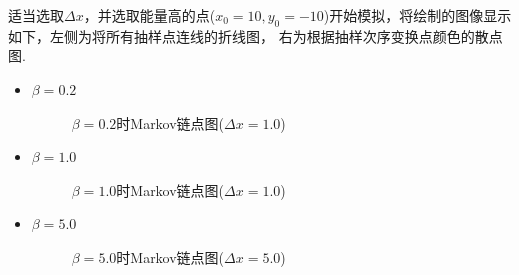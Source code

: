 \documentclass[12pt,a4paper,utf8]{ctexart}
\begin{document}
适当选取$\Delta x$，并选取能量高的点($x_0=10, y_0=-10$)开始模拟，将绘制的图像显示如下，左侧为将所有抽样点连线的折线图，
右为根据抽样次序变换点颜色的散点图.
\begin{itemize}
    \item $\beta=0.2$
        \begin{figure}[!h]
            \centering
            \hfill
            \caption{$\beta=0.2$时Markov链点图($\Delta x = 1.0$)}
        \end{figure}
    \item $\beta=1.0$
        \begin{figure}[!h]
            \centering
            \hfill
            \caption{$\beta=1.0$时Markov链点图($\Delta x = 1.0$)}
        \end{figure}
    \newpage
    \item $\beta=5.0$
        \begin{figure}[!h]
            \centering
            \hfill
            \caption{$\beta=5.0$时Markov链点图($\Delta x = 5.0$)}
        \end{figure}


\end{itemize}
\end{document}

